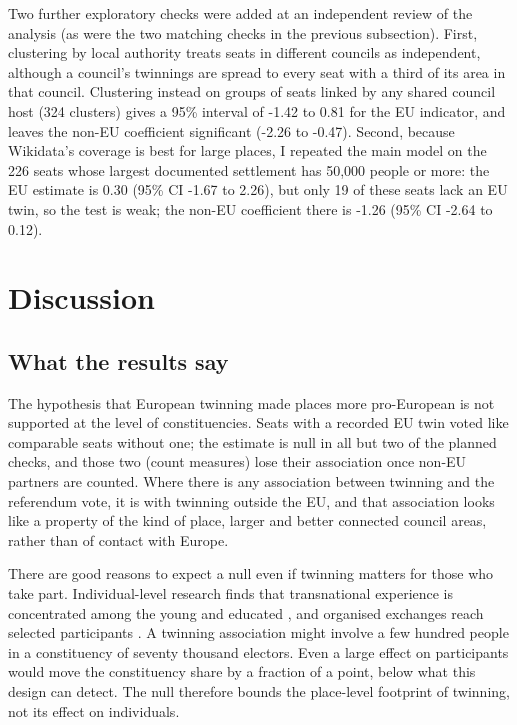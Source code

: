 \documentclass[11pt,a4paper]{article}
\begin{document}
Two further exploratory checks were added at an independent review of the analysis (as were the two matching checks in the previous subsection). First, clustering by local authority treats seats in different councils as independent, although a council's twinnings are spread to every seat with a third of its area in that council. Clustering instead on groups of seats linked by any shared council host (324 clusters) gives a 95\% interval of -1.42 to 0.81 for the EU indicator, and leaves the non-EU coefficient significant (-2.26 to -0.47). Second, because Wikidata's coverage is best for large places, I repeated the main model on the 226 seats whose largest documented settlement has 50,000 people or more: the EU estimate is 0.30 (95\% CI -1.67 to 2.26), but only 19 of these seats lack an EU twin, so the test is weak; the non-EU coefficient there is -1.26 (95\% CI -2.64 to 0.12).

\section{Discussion}\label{sec:disc}
\subsection{What the results say}
The hypothesis that European twinning made places more pro-European is not supported at the level of constituencies. Seats with a recorded EU twin voted like comparable seats without one; the estimate is null in all but two of the planned checks, and those two (count measures) lose their association once non-EU partners are counted. Where there is any association between twinning and the referendum vote, it is with twinning outside the EU, and that association looks like a property of the kind of place, larger and better connected council areas, rather than of contact with Europe.

There are good reasons to expect a null even if twinning matters for those who take part. Individual-level research finds that transnational experience is concentrated among the young and educated \citep{kuhn2015,fligstein2008}, and organised exchanges reach selected participants \citep{sigalas2010,mitchell2015}. A twinning association might involve a few hundred people in a constituency of seventy thousand electors. Even a large effect on participants would move the constituency share by a fraction of a point, below what this design can detect. The null therefore bounds the place-level footprint of twinning, not its effect on individuals.
\end{document}
